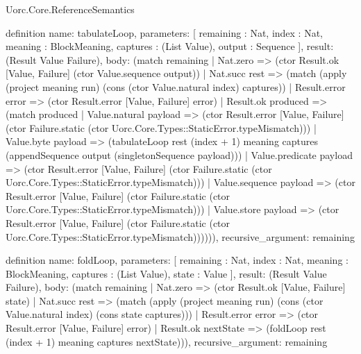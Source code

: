 \begin{lexlean}{Uorc.Core.ReferenceSemantics}
\begin{semanticmodule}
definition{
  name: tabulateLoop,
  parameters: [
    remaining : Nat,
    index : Nat,
    meaning : BlockMeaning,
    captures : (List Value),
    output : Sequence
  ],
  result: (Result Value Failure),
  body: (match remaining
    | Nat.zero => (ctor Result.ok [Value, Failure] (ctor Value.sequence output))
    | Nat.succ rest => (match (apply (project meaning run) (cons (ctor Value.natural index) captures))
      | Result.error error => (ctor Result.error [Value, Failure] error)
      | Result.ok produced => (match produced
        | Value.natural payload => (ctor Result.error [Value, Failure] (ctor Failure.static (ctor Uorc.Core.Types::StaticError.typeMismatch)))
        | Value.byte payload => (tabulateLoop rest (index + 1) meaning captures (appendSequence output (singletonSequence payload)))
        | Value.predicate payload => (ctor Result.error [Value, Failure] (ctor Failure.static (ctor Uorc.Core.Types::StaticError.typeMismatch)))
        | Value.sequence payload => (ctor Result.error [Value, Failure] (ctor Failure.static (ctor Uorc.Core.Types::StaticError.typeMismatch)))
        | Value.store payload => (ctor Result.error [Value, Failure] (ctor Failure.static (ctor Uorc.Core.Types::StaticError.typeMismatch)))))),
  recursive_argument: remaining
}

definition{
  name: foldLoop,
  parameters: [
    remaining : Nat,
    index : Nat,
    meaning : BlockMeaning,
    captures : (List Value),
    state : Value
  ],
  result: (Result Value Failure),
  body: (match remaining
    | Nat.zero => (ctor Result.ok [Value, Failure] state)
    | Nat.succ rest => (match (apply (project meaning run) (cons (ctor Value.natural index) (cons state captures)))
      | Result.error error => (ctor Result.error [Value, Failure] error)
      | Result.ok nextState => (foldLoop rest (index + 1) meaning captures nextState))),
  recursive_argument: remaining
}


\end{semanticmodule}
\end{lexlean}
